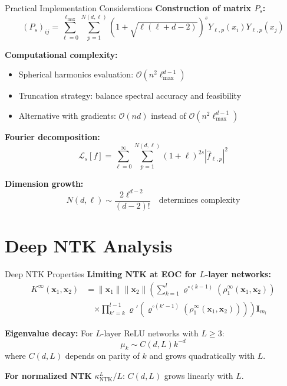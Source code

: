 \documentclass{beamer}
\begin{document}
\begin{frame}{Practical Implementation Considerations}
\textbf{Construction of matrix $P_s$:}
\[ (P_s)_{ij} = \sum_{\ell=0}^{\ell_{\max}} \sum_{p=1}^{N(d,\ell)} (1 + \sqrt{\ell(\ell + d - 2)})^s Y_{\ell,p}(x_i) Y_{\ell,p}(x_j) \]

\textbf{Computational complexity:}
\begin{itemize}
\item Spherical harmonics evaluation: $\mathcal{O}(n^2 \ell_{\max}^{d-1})$
\item Truncation strategy: balance spectral accuracy and feasibility
\item Alternative with gradients: $\mathcal{O}(nd)$ instead of $\mathcal{O}(n^2\ell_{\max}^{d-1})$
\end{itemize}

\textbf{Fourier decomposition:}
\[ \mathcal{L}_s[f] = \sum_{\ell=0}^{\infty} \sum_{p=1}^{N(d,\ell)} (1+\ell)^{2s} |\hat{f}_{\ell,p}|^2 \]

\textbf{Dimension growth:}
\[ N(d,\ell) \sim \frac{2\ell^{d-2}}{(d-2)!} \quad \text{determines complexity} \]
\end{frame}

\section{Deep NTK Analysis}

\begin{frame}{Deep NTK Properties}
\textbf{Limiting NTK at EOC for $L$-layer networks:}
\begin{align*}
K^{\infty}(\mathbf{x}_1, \mathbf{x}_2) &= \|\mathbf{x}_1\| \|\mathbf{x}_2\| \left( \sum_{k=1}^l \varrho^{\circ (k-1)}\left(\rho_1^{\infty}(\mathbf{x}_1, \mathbf{x}_2)\right) \right. \\
&\quad \left. \times \prod_{k'=k}^{l-1} \varrho'\left(\varrho^{\circ (k'-1)}\left(\rho_1^{\infty}(\mathbf{x}_1, \mathbf{x}_2)\right)\right) \right) \mathbf{I}_{m_l}
\end{align*}

\textbf{Eigenvalue decay:} For $L$-layer ReLU networks with $L \geq 3$:
\[ \mu_k \sim C(d, L)k^{-d} \]
where $C(d, L)$ depends on parity of $k$ and grows quadratically with $L$.

\textbf{For normalized NTK} $\kappa^L_{\text{NTK}}/L$: $C(d, L)$ grows linearly with $L$.
\end{frame}
\end{document}
